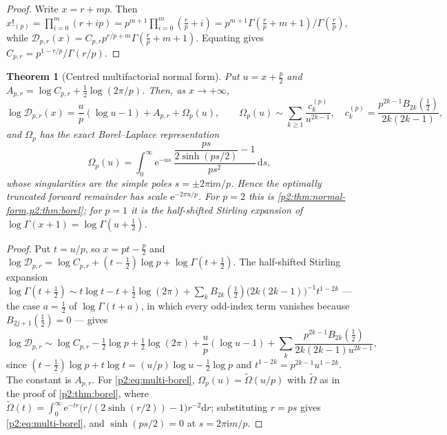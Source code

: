 \documentclass[11pt,a4paper,oneside]{book}
\theoremstyle{plain}
\newtheorem{theorem}{Theorem}[chapter]
\theoremstyle{definition}
\theoremstyle{remark}
\newcommand{\e}{\mathrm{e}}
\newcommand{\ii}{\mathrm{i}}
\newcommand{\dd}{\mathrm{d}}
\begin{document}
\begin{proof}
Write \(x=r+mp\).  Then
\(x!_{(p)}=\prod_{i=0}^{m}(r+ip)=p^{m+1}\prod_{i=0}^m(\tfrac rp+i)
=p^{m+1}\Gamma(\tfrac rp+m+1)/\Gamma(\tfrac rp)\), while
\(\mathcal D_{p,r}(x)=C_{p,r}p^{r/p+m}\Gamma(\tfrac rp+m+1)\).  Equating gives
\(C_{p,r}=p^{1-r/p}/\Gamma(r/p)\).
\end{proof}

\begin{theorem}[Centred multifactorial normal form]
\label{p2:thm:multi-normal}
Put \(u=x+\tfrac p2\) and
\(A_{p,r}=\log C_{p,r}+\tfrac12\log(2\pi/p)\).  Then, as \(x\to+\infty\),
\begin{equation}
 \log\mathcal D_{p,r}(x)=\frac up(\log u-1)+A_{p,r}+\Omega_p(u),
 \qquad
 \Omega_p(u)\sim\sum_{k\ge1}\frac{c^{(p)}_k}{u^{2k-1}},
 \quad
 c^{(p)}_k=\frac{p^{2k-1}B_{2k}(\tfrac12)}{2k(2k-1)},
 \label{p2:eq:multi-normal}
\end{equation}
and \(\Omega_p\) has the exact Borel--Laplace representation
\begin{equation}
 \Omega_p(u)=\int_0^\infty\e^{-us}\,
 \frac{\dfrac{ps}{2\sinh(ps/2)}-1}{ps^2}\,\dd s ,
 \label{p2:eq:multi-borel}
\end{equation}
whose singularities are the simple poles \(s=\pm2\pi\ii m/p\).  Hence the
optimally truncated forward remainder has scale \(\e^{-2\pi u/p}\).  For
\(p=2\) this is \cref{p2:thm:normal-form,p2:thm:borel}; for \(p=1\) it is the
half-shifted Stirling expansion of \(\log\Gamma(x+1)=\log\Gamma(u+\tfrac12)\).
\end{theorem}

\begin{proof}
Put \(t=u/p\), so \(x=pt-\tfrac p2\) and
\(\log\mathcal D_{p,r}=\log C_{p,r}+(t-\tfrac12)\log p
+\log\Gamma(t+\tfrac12)\).  The half-shifted Stirling expansion
\(\log\Gamma(t+\tfrac12)\sim t\log t-t+\tfrac12\log(2\pi)
+\sum_k B_{2k}(\tfrac12)\bigl(2k(2k-1)\bigr)^{-1}t^{1-2k}\) --- the case
\(a=\tfrac12\) of \(\log\Gamma(t+a)\), in which every odd-index term vanishes
because \(B_{2j+1}(\tfrac12)=0\) --- gives
\[
 \log\mathcal D_{p,r}
 \sim\log C_{p,r}-\tfrac12\log p+\tfrac12\log(2\pi)
 +\frac up(\log u-1)
 +\sum_k\frac{p^{2k-1}B_{2k}(\tfrac12)}{2k(2k-1)u^{2k-1}},
\]
since \((t-\tfrac12)\log p+t\log t=(u/p)\log u-\tfrac12\log p\) and
\(t^{1-2k}=p^{2k-1}u^{1-2k}\).  The constant is \(A_{p,r}\).  For
\cref{p2:eq:multi-borel}, \(\Omega_p(u)=\widetilde\Omega(u/p)\) with
\(\widetilde\Omega\) as in the proof of \cref{p2:thm:borel}, where
\(\widetilde\Omega(t)=\int_0^\infty\e^{-tr}
\bigl(r/(2\sinh(r/2))-1\bigr)r^{-2}\dd r\); substituting \(r=ps\) gives
\cref{p2:eq:multi-borel}, and \(\sinh(ps/2)=0\) at \(s=2\pi\ii m/p\).
\end{proof}
\end{document}
